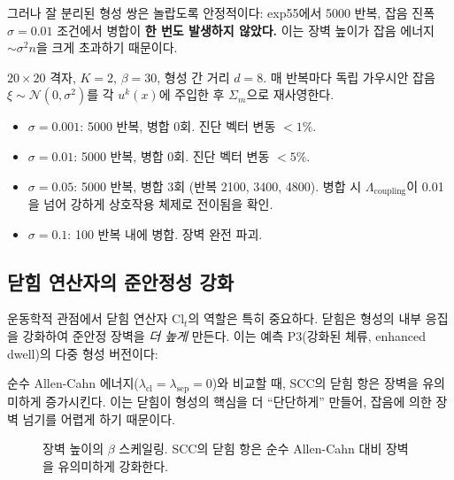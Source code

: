 그러나 잘 분리된 형성 쌍은 놀랍도록 안정적이다: exp55에서 5000 반복, 잡음 진폭 $\sigma = 0.01$ 조건에서 병합이 \textbf{한 번도 발생하지 않았다.} 이는 장벽 높이가 잡음 에너지 $\sim \sigma^2 n$을 크게 초과하기 때문이다.

\begin{example}[잡음 안정성 실험]
\label{ex:noise-stability}
$20 \times 20$ 격자, $K = 2$, $\beta = 30$, 형성 간 거리 $d = 8$. 매 반복마다 독립 가우시안 잡음 $\xi \sim \mathcal{N}(0, \sigma^2)$를 각 $u^k(x)$에 주입한 후 $\Sigma_m$으로 재사영한다.
\begin{itemize}
    \item $\sigma = 0.001$: 5000 반복, 병합 0회. 진단 벡터 변동 $< 1\%$.
    \item $\sigma = 0.01$: 5000 반복, 병합 0회. 진단 벡터 변동 $< 5\%$.
    \item $\sigma = 0.05$: 5000 반복, 병합 3회 (반복 2100, 3400, 4800). 병합 시 $\Lambda_{\mathrm{coupling}}$이 0.01을 넘어 강하게 상호작용 체제로 전이됨을 확인.
    \item $\sigma = 0.1$: 100 반복 내에 병합. 장벽 완전 파괴.
\end{itemize}
\end{example}

\begin{center}
\end{center}

\subsection{닫힘 연산자의 준안정성 강화}

운동학적 관점에서 닫힘 연산자 $\mathrm{Cl}_t$의 역할은 특히 중요하다. 닫힘은 형성의 내부 응집을 강화하여 준안정 장벽을 \emph{더 높게} 만든다. 이는 예측 P3(강화된 체류, enhanced dwell)의 다중 형성 버전이다:

순수 Allen-Cahn 에너지($\lambda_{\mathrm{cl}} = \lambda_{\mathrm{sep}} = 0$)와 비교할 때, SCC의 닫힘 항은 장벽을 유의미하게 증가시킨다. 이는 닫힘이 형성의 핵심을 더 ``단단하게'' 만들어, 잡음에 의한 장벽 넘기를 어렵게 하기 때문이다.

\begin{figure}[t]
\centering
{}
\caption{장벽 높이의 $\beta$ 스케일링. SCC의 닫힘 항은 순수 Allen-Cahn 대비 장벽을 유의미하게 강화한다.}
\label{fig:barrier-scaling}
\end{figure}


